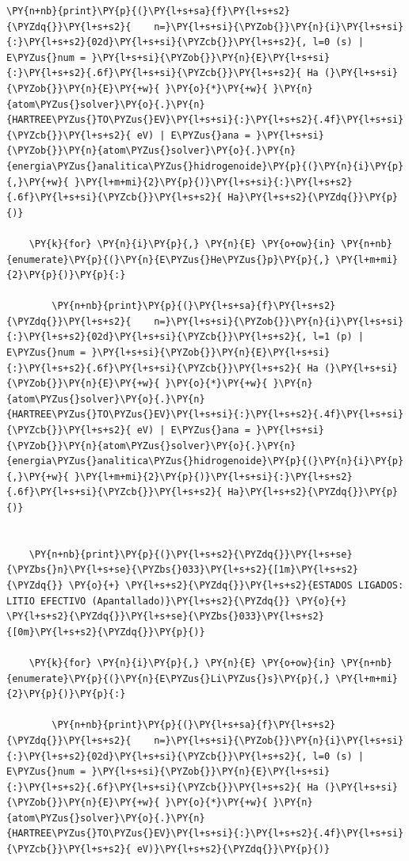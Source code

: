 \documentclass[11pt]{article}
\makeatletter
\def\PY@reset{\let\PY@it=\relax \let\PY@bf=\relax \let\PY@ul=\relax \let\PY@tc=\relax \let\PY@bc=\relax \let\PY@ff=\relax}
\def\PY@tok#1{\csname PY@tok@#1\endcsname}
\def\PY@toks#1+{\ifx\relax#1\empty\else \PY@tok{#1}\expandafter\PY@toks\fi}
\def\PY@do#1{\PY@bc{\PY@tc{\PY@ul{\PY@it{\PY@bf{\PY@ff{#1}}}}}}}
\def\PY#1#2{\PY@reset\PY@toks#1+\relax+\PY@do{#2}}
\def\PYZbs{\char`\\} \def\PYZus{\char`\_} \def\PYZob{\char`\{} \def\PYZcb{\char`\}} \def\PYZca{\char`\^} \def\PYZam{\char`\&} \def\PYZlt{\char`\<} \def\PYZgt{\char`\>} \def\PYZsh{\char`\#} \def\PYZpc{\char`\%} \def\PYZdl{\char`\$} \def\PYZhy{\char`\-} \def\PYZsq{\char`\'} \def\PYZdq{\char`\"} \def\PYZti{\char`\~}
\makeatother
\begin{document}
\begin{tcolorbox}[breakable, size=fbox, boxrule=1pt, pad at break*=1mm,colback=cellbackground, colframe=cellborder]
\begin{Verbatim}[commandchars=\\\{\}]
        \PY{n+nb}{print}\PY{p}{(}\PY{l+s+sa}{f}\PY{l+s+s2}{\PYZdq{}}\PY{l+s+s2}{    n=}\PY{l+s+si}{\PYZob{}}\PY{n}{i}\PY{l+s+si}{:}\PY{l+s+s2}{02d}\PY{l+s+si}{\PYZcb{}}\PY{l+s+s2}{, l=0 (s) | E\PYZus{}num = }\PY{l+s+si}{\PYZob{}}\PY{n}{E}\PY{l+s+si}{:}\PY{l+s+s2}{.6f}\PY{l+s+si}{\PYZcb{}}\PY{l+s+s2}{ Ha (}\PY{l+s+si}{\PYZob{}}\PY{n}{E}\PY{+w}{ }\PY{o}{*}\PY{+w}{ }\PY{n}{atom\PYZus{}solver}\PY{o}{.}\PY{n}{HARTREE\PYZus{}TO\PYZus{}EV}\PY{l+s+si}{:}\PY{l+s+s2}{.4f}\PY{l+s+si}{\PYZcb{}}\PY{l+s+s2}{ eV) | E\PYZus{}ana = }\PY{l+s+si}{\PYZob{}}\PY{n}{atom\PYZus{}solver}\PY{o}{.}\PY{n}{energia\PYZus{}analitica\PYZus{}hidrogenoide}\PY{p}{(}\PY{n}{i}\PY{p}{,}\PY{+w}{ }\PY{l+m+mi}{2}\PY{p}{)}\PY{l+s+si}{:}\PY{l+s+s2}{.6f}\PY{l+s+si}{\PYZcb{}}\PY{l+s+s2}{ Ha}\PY{l+s+s2}{\PYZdq{}}\PY{p}{)}

    \PY{k}{for} \PY{n}{i}\PY{p}{,} \PY{n}{E} \PY{o+ow}{in} \PY{n+nb}{enumerate}\PY{p}{(}\PY{n}{E\PYZus{}He\PYZus{}p}\PY{p}{,} \PY{l+m+mi}{2}\PY{p}{)}\PY{p}{:}

        \PY{n+nb}{print}\PY{p}{(}\PY{l+s+sa}{f}\PY{l+s+s2}{\PYZdq{}}\PY{l+s+s2}{    n=}\PY{l+s+si}{\PYZob{}}\PY{n}{i}\PY{l+s+si}{:}\PY{l+s+s2}{02d}\PY{l+s+si}{\PYZcb{}}\PY{l+s+s2}{, l=1 (p) | E\PYZus{}num = }\PY{l+s+si}{\PYZob{}}\PY{n}{E}\PY{l+s+si}{:}\PY{l+s+s2}{.6f}\PY{l+s+si}{\PYZcb{}}\PY{l+s+s2}{ Ha (}\PY{l+s+si}{\PYZob{}}\PY{n}{E}\PY{+w}{ }\PY{o}{*}\PY{+w}{ }\PY{n}{atom\PYZus{}solver}\PY{o}{.}\PY{n}{HARTREE\PYZus{}TO\PYZus{}EV}\PY{l+s+si}{:}\PY{l+s+s2}{.4f}\PY{l+s+si}{\PYZcb{}}\PY{l+s+s2}{ eV) | E\PYZus{}ana = }\PY{l+s+si}{\PYZob{}}\PY{n}{atom\PYZus{}solver}\PY{o}{.}\PY{n}{energia\PYZus{}analitica\PYZus{}hidrogenoide}\PY{p}{(}\PY{n}{i}\PY{p}{,}\PY{+w}{ }\PY{l+m+mi}{2}\PY{p}{)}\PY{l+s+si}{:}\PY{l+s+s2}{.6f}\PY{l+s+si}{\PYZcb{}}\PY{l+s+s2}{ Ha}\PY{l+s+s2}{\PYZdq{}}\PY{p}{)}


    \PY{n+nb}{print}\PY{p}{(}\PY{l+s+s2}{\PYZdq{}}\PY{l+s+se}{\PYZbs{}n}\PY{l+s+se}{\PYZbs{}033}\PY{l+s+s2}{[1m}\PY{l+s+s2}{\PYZdq{}} \PY{o}{+} \PY{l+s+s2}{\PYZdq{}}\PY{l+s+s2}{ESTADOS LIGADOS: LITIO EFECTIVO (Apantallado)}\PY{l+s+s2}{\PYZdq{}} \PY{o}{+} \PY{l+s+s2}{\PYZdq{}}\PY{l+s+se}{\PYZbs{}033}\PY{l+s+s2}{[0m}\PY{l+s+s2}{\PYZdq{}}\PY{p}{)}

    \PY{k}{for} \PY{n}{i}\PY{p}{,} \PY{n}{E} \PY{o+ow}{in} \PY{n+nb}{enumerate}\PY{p}{(}\PY{n}{E\PYZus{}Li\PYZus{}s}\PY{p}{,} \PY{l+m+mi}{2}\PY{p}{)}\PY{p}{:}

        \PY{n+nb}{print}\PY{p}{(}\PY{l+s+sa}{f}\PY{l+s+s2}{\PYZdq{}}\PY{l+s+s2}{    n=}\PY{l+s+si}{\PYZob{}}\PY{n}{i}\PY{l+s+si}{:}\PY{l+s+s2}{02d}\PY{l+s+si}{\PYZcb{}}\PY{l+s+s2}{, l=0 (s) | E\PYZus{}num = }\PY{l+s+si}{\PYZob{}}\PY{n}{E}\PY{l+s+si}{:}\PY{l+s+s2}{.6f}\PY{l+s+si}{\PYZcb{}}\PY{l+s+s2}{ Ha (}\PY{l+s+si}{\PYZob{}}\PY{n}{E}\PY{+w}{ }\PY{o}{*}\PY{+w}{ }\PY{n}{atom\PYZus{}solver}\PY{o}{.}\PY{n}{HARTREE\PYZus{}TO\PYZus{}EV}\PY{l+s+si}{:}\PY{l+s+s2}{.4f}\PY{l+s+si}{\PYZcb{}}\PY{l+s+s2}{ eV)}\PY{l+s+s2}{\PYZdq{}}\PY{p}{)}


\end{Verbatim}
\end{tcolorbox}
\end{document}
